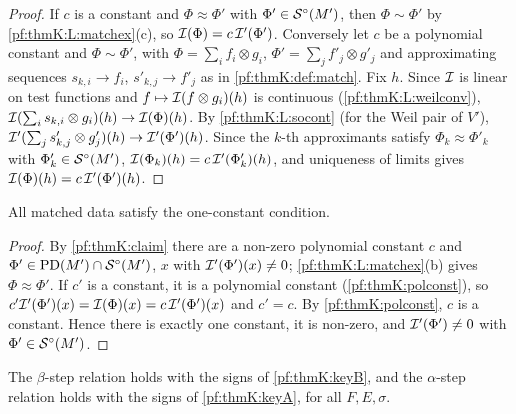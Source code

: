 \begin{proof}
If $c$ is a constant and $\Phi\approx\Phi'$ with $\Phi'\in\mathcal{S}^{\circ}(M')$, then $\Phi\sim\Phi'$ by \ref{pf:thmK:L:matchex}(c),
so $\mathcal{I}(\Phi)=c\,\mathcal{I}'(\Phi')$. Conversely let $c$ be a polynomial constant and $\Phi\sim\Phi'$, with
$\Phi=\sum_if_i\otimes g_i$, $\Phi'=\sum_jf'_j\otimes g'_j$ and approximating sequences $s_{k,i}\to f_i$, $s'_{k,j}\to f'_j$ as
in \cref{pf:thmK:def:match}. Fix $h$. Since $\mathcal{I}$ is linear on test functions and $f\mapsto\mathcal{I}(f\otimes g_i)(h)$ is
continuous (\ref{pf:thmK:L:weilconv}), $\mathcal{I}(\sum_is_{k,i}\otimes g_i)(h)\to\mathcal{I}(\Phi)(h)$. By \ref{pf:thmK:L:socont} (for
the Weil pair of $V'$), $\mathcal{I}'(\sum_js'_{k,j}\otimes g'_j)(h)\to\mathcal{I}'(\Phi')(h)$. Since the $k$-th approximants satisfy
$\Phi_k\approx\Phi'_k$ with $\Phi'_k\in\mathcal{S}^{\circ}(M')$, $\mathcal{I}(\Phi_k)(h)=c\,\mathcal{I}'(\Phi'_k)(h)$, and uniqueness of limits
gives $\mathcal{I}(\Phi)(h)=c\,\mathcal{I}'(\Phi')(h)$.
\end{proof}

\begin{proposition}\label{pf:thmK:kconst}
All matched data satisfy the one-constant condition.
\end{proposition}

\begin{proof}
By \cref{pf:thmK:claim} there are a non-zero polynomial constant $c$ and $\Phi'\in\operatorname{PD}(M')\cap\mathcal{S}^{\circ}(M')$, $x$ with
$\mathcal{I}'(\Phi')(x)\ne0$; \ref{pf:thmK:L:matchex}(b) gives $\Phi\approx\Phi'$. If $c'$ is a constant, it is a polynomial
constant (\cref{pf:thmK:polconst}), so $c'\mathcal{I}'(\Phi')(x)=\mathcal{I}(\Phi)(x)=c\,\mathcal{I}'(\Phi')(x)$ and $c'=c$. By
\cref{pf:thmK:polconst}, $c$ is a constant. Hence there is exactly one constant, it is non-zero, and $\mathcal{I}'(\Phi')\ne0$
with $\Phi'\in\mathcal{S}^{\circ}(M')$.
\end{proof}

\begin{proposition}\label{pf:thmK:ksteps}
The $\beta$-step relation holds with the signs of \cref{pf:thmK:keyB}, and the $\alpha$-step relation holds with the signs
of \cref{pf:thmK:keyA}, for all $F,E,\sigma$.
\end{proposition}

